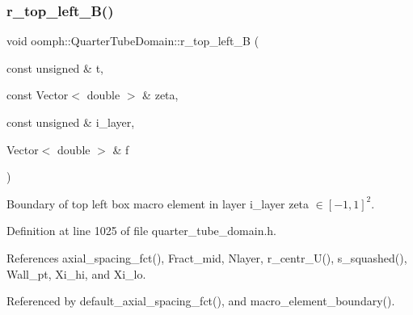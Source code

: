 \mbox{\label{classoomph_1_1QuarterTubeDomain_ab7a0b29926aff44bb26d5544c8dadfb0}} 
\subsubsection{\texorpdfstring{r\+\_\+top\+\_\+left\+\_\+\+B()}{r\_top\_left\_B()}}
{\footnotesize\ttfamily void oomph\+::\+Quarter\+Tube\+Domain\+::r\+\_\+top\+\_\+left\+\_\+B (\begin{DoxyParamCaption}\item[{const unsigned \&}]{t,  }\item[{const Vector$<$ double $>$ \&}]{zeta,  }\item[{const unsigned \&}]{i\+\_\+layer,  }\item[{Vector$<$ double $>$ \&}]{f }\end{DoxyParamCaption})\hspace{0.3cm}{\ttfamily [private]}}



Boundary of top left box macro element in layer i\+\_\+layer zeta $ \in [-1,1]^2 $. 



Definition at line 1025 of file quarter\+\_\+tube\+\_\+domain.\+h.



References axial\+\_\+spacing\+\_\+fct(), Fract\+\_\+mid, Nlayer, r\+\_\+centr\+\_\+\+U(), s\+\_\+squashed(), Wall\+\_\+pt, Xi\+\_\+hi, and Xi\+\_\+lo.



Referenced by default\+\_\+axial\+\_\+spacing\+\_\+fct(), and macro\+\_\+element\+\_\+boundary().

\mbox{\label{classoomph_1_1QuarterTubeDomain_a07e5e6c5549b5cda5adbc91c8c9fdcbb}} 
